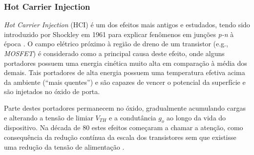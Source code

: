 \subsubsection{Hot Carrier Injection}
\label{subsection_HCI}
\textit{Hot Carrier Injection} (HCI) é um dos efeitos mais antigos e estudados, tendo sido introduzido por Shockley em 1961 para explicar fenômenos em junções \textit{p-n} à época \cite{Shockley1961}. O campo elétrico próximo à região de dreno de um transistor (e.g., \textit{MOSFET}) é considerado como a principal causa deste efeito, onde alguns portadores possuem uma energia cinética muito alta em comparação à média dos demais. Tais portadores de alta energia possuem uma temperatura efetiva acima da ambiente (``mais quentes'') e são capazes de vencer o potencial da superfície e são injetados no óxido de porta.

Parte destes portadores permanecem no óxido, gradualmente acumulando cargas e alterando a tensão de limiar $V_{TH}$ e a condutância $g_{o}$ ao longo da vida do dispositivo. Na década de 80 estes efeitos começaram a chamar a atenção, como consequência da redução contínua da escala dos transistores sem que existisse uma redução da tensão de alimentação \cite{Takeda1983}.

